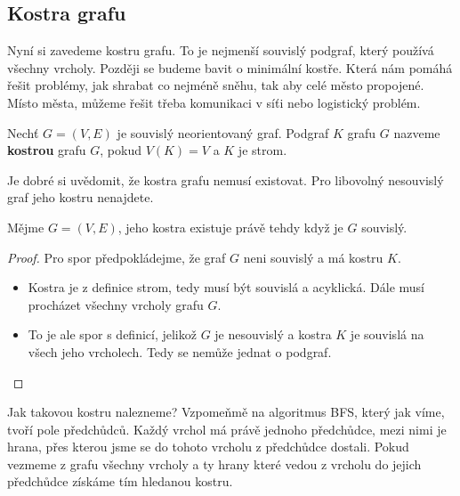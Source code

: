 \newpage

\subsection{Kostra grafu}

\noindent Nyní si zavedeme kostru grafu. To je nejmenší souvislý podgraf, který používá všechny vrcholy. Později se budeme bavit o minimální kostře. Která nám pomáhá řešit problémy, jak shrabat co nejméně sněhu, tak aby celé město propojené. Místo města, můžeme řešit třeba komunikaci v síťi nebo logistický problém.

\medskip

\begin{definition}
Nechť $G = (V, E)$ je souvislý neorientovaný graf. Podgraf $K$ grafu $G$ nazveme \textbf{kostrou} grafu $G$, pokud $V(K) = V$ a $K$ je strom.
\end{definition} \medskip

\begin{center}
    
\end{center} \medskip

\noindent Je dobré si uvědomit, že kostra grafu nemusí existovat. Pro libovolný nesouvislý graf jeho kostru nenajdete. 

\medskip

\begin{observation}
  Mějme $G = (V, E)$, jeho kostra existuje právě tehdy když je $G$ souvislý.
\end{observation}
\begin{proof}
Pro spor předpokládejme, že graf $G$ neni souvislý a má kostru $K$.
  \begin{itemize}
      \item Kostra je z definice strom, tedy musí být souvislá a acyklická. Dále musí procházet všechny vrcholy grafu $G$.
      \item To je ale spor s definicí, jelikož $G$ je nesouvislý a kostra $K$ je souvislá na všech jeho vrcholech. Tedy se nemůže jednat o podgraf.
  \end{itemize}
\end{proof}

\bigskip

\noindent Jak takovou kostru nalezneme? Vzpomeňmě na algoritmus BFS, který jak víme, tvoří pole předchůdců. Každý vrchol má právě jednoho předchůdce, mezi nimi je hrana, přes kterou jsme se do tohoto vrcholu z předchůdce dostali. Pokud vezmeme z grafu všechny vrcholy a ty hrany které vedou z vrcholu do jejich předchůdce získáme tím hledanou kostru.\bigskip


